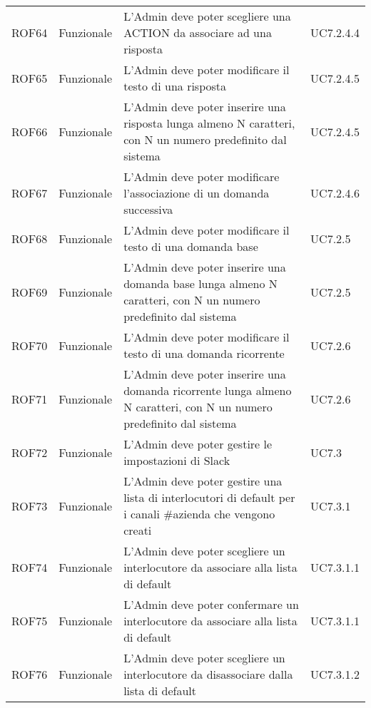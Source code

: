 \documentclass[../AnalisiDeiRequisiti.tex]{subfiles}
\begin{document}
\begin{longtable}{p{2.5cm}!{\VRule[1pt]}p{2.5cm}!{\VRule[1pt]}p{5cm}!{\VRule[1pt]}p{2.5cm}}
	ROF64&Funzionale\newline  & L'Admin deve poter scegliere una ACTION da associare ad una risposta & UC7.2.4.4 \\
	ROF65&Funzionale\newline  & L'Admin deve poter modificare il testo di una risposta & UC7.2.4.5 \\
	ROF66&Funzionale\newline  & L'Admin deve poter inserire una risposta lunga almeno N caratteri, con N un numero predefinito dal sistema & UC7.2.4.5 \\
	ROF67&Funzionale\newline  & L'Admin deve poter modificare l'associazione di un domanda successiva & UC7.2.4.6 \\
	ROF68&Funzionale\newline  & L'Admin deve poter modificare il testo di una domanda base & UC7.2.5 \\
	ROF69&Funzionale\newline  & L'Admin deve poter inserire una domanda base lunga almeno N caratteri, con N un numero predefinito dal sistema & UC7.2.5 \\
	ROF70&Funzionale\newline  & L'Admin deve poter modificare il testo di una domanda ricorrente & UC7.2.6 \\
	ROF71&Funzionale\newline  & L'Admin deve poter inserire una domanda ricorrente lunga almeno N caratteri, con N un numero predefinito dal sistema & UC7.2.6 \\
	ROF72&Funzionale\newline  & L'Admin deve poter gestire le impostazioni di Slack & UC7.3 \\
	ROF73&Funzionale\newline  & L'Admin deve poter gestire una lista di interlocutori di default per i canali \#azienda che vengono creati & UC7.3.1 \\
	ROF74&Funzionale\newline  & L'Admin deve poter scegliere un interlocutore da associare alla lista di default & UC7.3.1.1 \\
	ROF75&Funzionale\newline  & L'Admin deve poter confermare un interlocutore da associare alla lista di default & UC7.3.1.1 \\
	ROF76&Funzionale\newline  & L'Admin deve poter scegliere un interlocutore da disassociare dalla lista di default & UC7.3.1.2 \\

\end{longtable}
\end{document}

